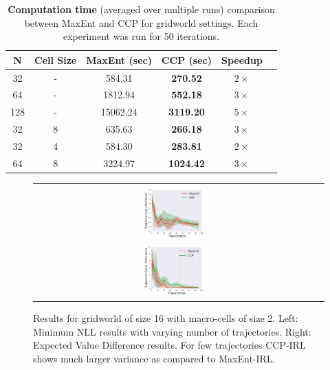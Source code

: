 \documentclass{article}
\def\MSHangBox#1{%
\begin{minipage}[t]{\textwidth}%
\begin{tabbing} %
~\\[-\baselineskip] %
#1 %
\end{tabbing}%
\end{minipage}} %
\begin{document}
\begin{table}[t]
\centering
\def\arraystretch{1.0}%
\begin{tabular}{|c|c|c|c|c|c|}
\hline
N & Cell Size & MaxEnt (sec) & CCP (sec) & Speedup \\\hline

32 & - & 584.31 & \textbf{270.52} & $2\times$ \\
64 & - & 1812.94 & \textbf{552.18} & $3\times$\\
128& - & 15062.24 & \textbf{3119.20} & $5\times$ \\
32 & 8 & 635.63 & \textbf{266.18} & $3\times$ \\
32 & 4 & 584.30 & \textbf{283.81} & $2\times$ \\
64 & 8 & 3224.97 & \textbf{1024.42} & $3\times$ \\
\hline
\end{tabular}
\caption{\textbf{Computation time} (averaged over multiple runs) comparison between MaxEnt and CCP for gridworld settings. Each experiment was run for 50 iterations.}
\label{table:table_results_macro_cells}
\end{table}



\begin{figure}[t]
\centering
  \begin{tabular}{cc}
    \MSHangBox{\includegraphics[width=0.22\textwidth]{images/gridworld/macro_cells/grid_16_macro_2_lr_05/ll_ccp_vs_maxent_per_traj.pdf}}&
    \MSHangBox{\includegraphics[width=0.22\textwidth]{images/gridworld/macro_cells/grid_16_macro_2_lr_05/evd_multiple_tries.pdf}}
    \end{tabular}
    \caption{Results for gridworld of size 16 with macro-cells of size 2. Left: Minimum NLL results with varying number of trajectories. Right: Expected Value Difference results. For few trajectories CCP-IRL shows much larger variance as compared to MaxEnt-IRL.}
    \label{fig:img_maxent_vs_ccp_gridworld_macro_cell}
\end{figure}
\end{document}
